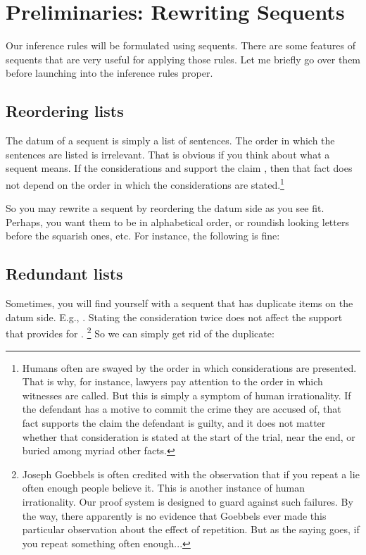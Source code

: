 \section{Preliminaries: Rewriting Sequents}

Our inference rules will be formulated using sequents. There are some features 
of sequents that are very useful for applying those rules. Let me briefly go 
over them before launching into the inference rules proper.




\subsection{Reordering lists}

The datum of a sequent is simply a list of sentences. The order in which the 
sentences are listed is irrelevant. That is obvious if you think about what a 
sequent means. If the considerations  and  support the claim , 
then that fact does not depend on the order in which the considerations are 
stated.\footnote{Humans often are swayed by the order in which considerations 
 are presented. That is why, for instance, lawyers pay attention to the order in 
 which witnesses are called. But this is simply a symptom of human 
 irrationality. If the defendant has a motive to commit the crime they are 
accused of, that fact supports the claim the defendant is guilty, and it does 
not matter whether that consideration is stated at the start of the trial, near 
the end, or buried among myriad other facts.}

So you may rewrite a sequent by reordering the datum side as you see fit.  
Perhaps, you want them to be in alphabetical order, or roundish looking letters  
before the squarish ones, etc. For instance, the following is fine:

\begin{argument}
 \aitem {}
 \aitem {}
\end{argument}



\subsection{Redundant lists}

Sometimes, you will find yourself with a sequent that has duplicate items on the 
datum side. E.g., . Stating the consideration  twice does 
not affect the support that  provides for .%
\footnote{Joseph Goebbels is often credited with the observation that if you 
 repeat a lie often enough people believe it. This is another instance of human 
 irrationality. Our proof system is designed to guard against such failures. By 
 the way, there apparently is no evidence that Goebbels ever made this 
particular observation about the effect of repetition. But as the saying goes, 
if you repeat something often enough...  }
 So we can simply get rid of the duplicate:
\begin{itemize}
 \aitem {}
 \aitem {}
 \end{itemize}

